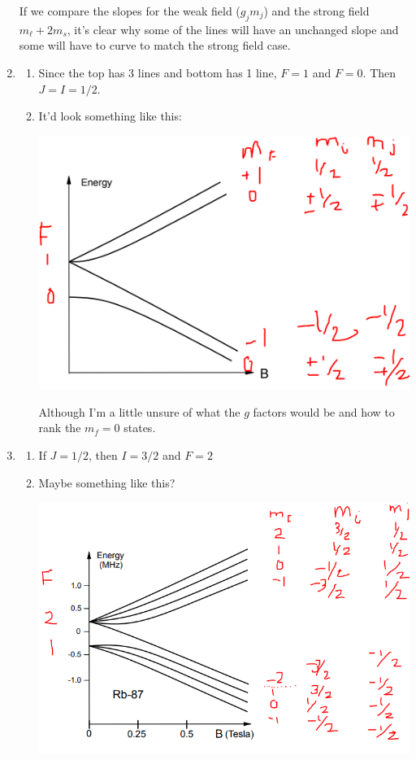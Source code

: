 \documentclass{homework}
\begin{document}
\begin{enumerate}
		If we compare the slopes for the weak field ($g_j m_j$) and the strong field $m_\ell + 2 m_s$, it's clear why some of the lines will have an unchanged slope and some will have to curve to match the strong field case.
		
		\item \begin{enumerate}
			\item Since the top has 3 lines and bottom has 1 line, $F=1$ and $F=0$. Then $J=I=1/2$.
			\item It'd look something like this:
			\begin{center}
				\includegraphics[width=0.7\linewidth]{hw4_6}
			\end{center}
			Although I'm a little unsure of what the $g$ factors would be and how to rank the $m_f=0$ states.
		\end{enumerate}
		
		\pagebreak
		
		\item \begin{enumerate}
			\item If $J=1/2$, then $I=3/2$ and $F=2$
			\item Maybe something like this?
			
			\begin{center}
				\includegraphics[width=0.7\linewidth]{hw4_7}
			\end{center}
			
		\end{enumerate}
	\end{enumerate}
\end{document}
